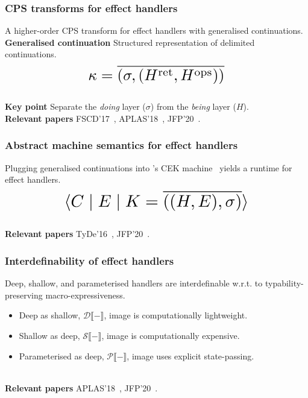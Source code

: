 \documentclass[169,10pt,compress,dvipsnames]{beamer}
\newcommand*{\Scale}[2][4]{\scalebox{#1}{\ensuremath{#2}}}%
\begin{document}
\begin{frame}
  \frametitle{CPS transforms for effect handlers}

  A higher-order CPS transform for effect handlers with generalised
  continuations.\\[1em]

  \textbf{Generalised continuation} Structured representation of
  delimited continuations.\\[0.5em]

  \[
    \Scale[1.8]{\kappa = \overline{(\sigma, (\hret,\hops))}}
  \]\\[1em]

  \textbf{Key point} Separate the \emph{doing} layer ($\sigma$) from the \emph{being} layer ($H$).\\[2em]

  \textbf{Relevant papers} FSCD'17~\cite{HillerstromLAS17},
  APLAS'18~\cite{HillerstromL18}, JFP'20~\cite{HillerstromLA20}.
\end{frame}

\begin{frame}
  \frametitle{Abstract machine semantics for effect handlers}

  Plugging generalised continuations into \citeauthor{FelleisenF86}'s
  CEK machine~\cite{FelleisenF86} yields a runtime for effect
  handlers.\\[2em]

  \[
    \Scale[2]{\cek{C \mid E \mid K = \overline{((H,E), \sigma)}}}
  \]\\[2em]

  \textbf{Relevant papers} TyDe'16~\cite{HillerstromL16},
  JFP'20~\cite{HillerstromLA20}.

\end{frame}

\begin{frame}
  \frametitle{Interdefinability of effect handlers}

  Deep, shallow, and parameterised handlers are interdefinable
  w.r.t. to typability-preserving macro-expressiveness.

  \begin{itemize}
    \item Deep as shallow, $\mathcal{D}\llbracket - \rrbracket$, image is computationally lightweight.
    \item Shallow as deep, $\mathcal{S}\llbracket - \rrbracket$, image is computationally expensive.
    \item Parameterised as deep, $\mathcal{P}\llbracket - \rrbracket$,
      image uses explicit state-passing.
    \end{itemize}
    ~\\[1em]
    \textbf{Relevant papers} APLAS'18~\cite{HillerstromL18},
    JFP'20~\cite{HillerstromLA20}.

\end{frame}
\end{document}
